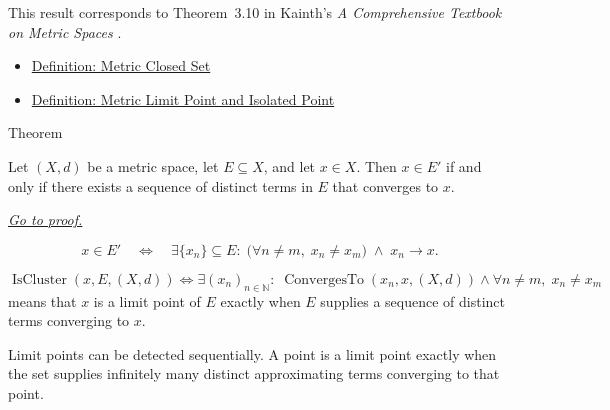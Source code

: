 \begin{remark*}
This result corresponds to Theorem~3.10 in Kainth's
\emph{A Comprehensive Textbook on Metric Spaces}
\cite{KainthComprehensiveMetricSpaces2023}.
\end{remark*}

\begin{dependencies}
\begin{itemize}
  \item \hyperref[def:metric-closed-set]{Definition: Metric Closed Set}
  \item \hyperref[def:metric-limit-point-isolated-point]{Definition: Metric Limit Point and Isolated Point}
\end{itemize}
\end{dependencies}

\begin{theorembox}{Theorem}
\begin{theorem}
\label{thm:metric-limit-point-sequential-characterization}
Let \((X,d)\) be a metric space, let \(E\subseteq X\), and let \(x\in X\).
Then \(x\in E'\) if and only if there exists a sequence of distinct terms in
\(E\) that converges to \(x\).

\smallskip
\noindent
\hyperref[prf:metric-limit-point-sequential-characterization]{\textit{Go to proof.}}
\end{theorem}
\end{theorembox}

\begin{remark*}
\[
x\in E'
\quad\Longleftrightarrow\quad
\exists \{x_n\}\subseteq E{:}\;
\bigl(\forall n\neq m,\;x_n\neq x_m\bigr)
\;\land\;
x_n\to x.
\]
\end{remark*}

\begin{remark*}
\[
\operatorname{IsCluster}(x,E,(X,d))
\Longleftrightarrow
\exists (x_n)_{n\in\mathbb{N}}{:}\;
\operatorname{ConvergesTo}(x_n,x,(X,d))
\land
\forall n\neq m,\;x_n\neq x_m
\]
means that \(x\) is a limit point of \(E\) exactly when \(E\) supplies a
sequence of distinct terms converging to \(x\).
\end{remark*}

\begin{remark*}[Interpretation]
Limit points can be detected sequentially.  A point is a limit point exactly
when the set supplies infinitely many distinct approximating terms converging
to that point.
\end{remark*}

